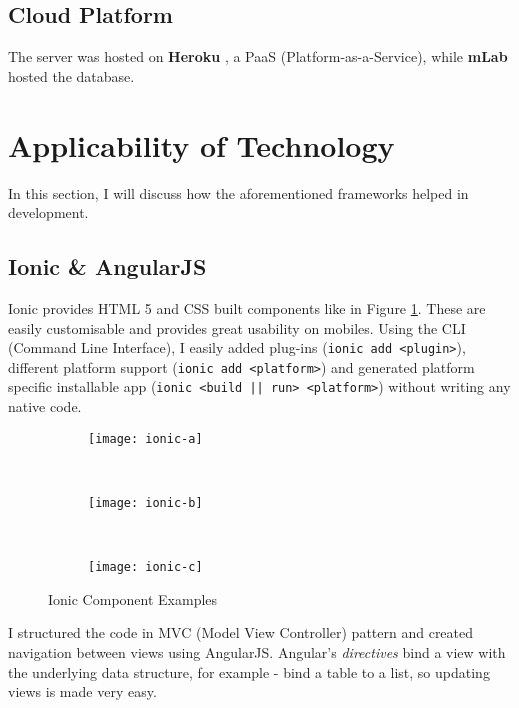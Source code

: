 \subsection{Cloud Platform}

The server was hosted on \textbf{Heroku} \cite{heroku-site}, a PaaS (Platform-as-a-Service), while \textbf{mLab} \cite{mlab-site} hosted the database.



\section{Applicability of Technology}

In this section, I will discuss how the aforementioned frameworks helped in development.

\subsection{Ionic \& AngularJS}

Ionic provides HTML 5 and CSS built components like in Figure \ref{fig:ionic-comp-ex}. These are easily customisable and provides great usability on mobiles. Using the CLI (Command Line Interface), I easily added plug-ins  (\texttt{ionic add <plugin>}), different platform support (\texttt{ionic add <platform>}) and generated platform specific installable app (\texttt{ionic <build || run> <platform>}) without writing any native code.\\

\begin{figure}[h]
    \centering
    \begin{subfigure}[b]{0.3\textwidth}
        \texttt{[image: ionic-a]}
    \end{subfigure}
    ~
    \begin{subfigure}[b]{0.3\textwidth}
        \texttt{[image: ionic-b]}
    \end{subfigure}
    ~ 
    \begin{subfigure}[b]{0.3\textwidth}
        \texttt{[image: ionic-c]}
    \end{subfigure}
    \caption{Ionic Component Examples}\label{fig:ionic-comp-ex}
\end{figure}

I structured the code in MVC (Model View Controller) pattern and created navigation between views using AngularJS. Angular's \textit{directives} bind a view with the underlying data structure, for example - bind a table to a list, so updating views is made very easy.

